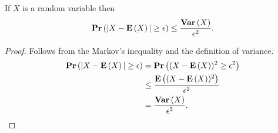 \begin{theorem}
If $X$ is a random variable then \[ \mathbf{Pr}\left(|X - \mathbf{E}\left(X\right)| \geq \epsilon\right) \leq \frac{\mathbf{Var}\left(X\right)}{\epsilon ^ 2} \text{.} \]
\end{theorem}
\begin{proof}
Follows from the Markov's inequality and the definition of variance.
\[
\begin{split}
\mathbf{Pr}\left(|X - \mathbf{E}\left(X\right)| \geq \epsilon\right) 
	& = \mathbf{Pr}\left((X - \mathbf{E}\left(X\right)) ^ 2 \geq \epsilon ^ 2\right) \\
	& \leq \frac{\mathbf{E}\left((X - \mathbf{E}\left(X\right)) ^ 2\right)}{\epsilon ^ 2} \\
	& = \frac{\mathbf{Var}\left(X\right)}{\epsilon ^ 2} \text{.}
\end{split}
\]
\end{proof}
